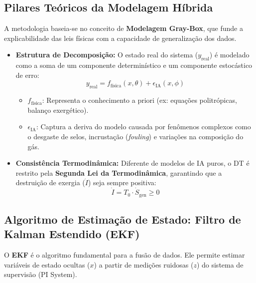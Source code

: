 \documentclass[12pt,a4paper]{article}
\numberwithin{equation}{section}
\numberwithin{table}{section}
\numberwithin{figure}{section}
\begin{document}
	\subsection{Pilares Teóricos da Modelagem Híbrida}
	
	A metodologia baseia-se no conceito de \textbf{Modelagem Gray-Box}, que funde a explicabilidade das leis físicas com a capacidade de generalização dos dados.
	
	\begin{itemize}
		\item \textbf{Estrutura de Decomposição:}
		O estado real do sistema ($y_{\text{real}}$) é modelado como a soma de um componente determinístico e um componente estocástico de erro:
		\begin{equation}\label{eq:s20-1}
 y_{\text{real}} = f_{\text{física}}(x, \theta) + \epsilon_{\text{IA}}(x, \phi) 
\end{equation}
		\begin{itemize}
			\item $f_{\text{física}}$: Representa o conhecimento a priori (ex: equações politrópicas, balanço exergético).
			\item $\epsilon_{\text{IA}}$: Captura a deriva do modelo causada por fenômenos complexos como o desgaste de selos, incrustação (\textit{fouling}) e variações na composição do gás.
		\end{itemize}
		
		\item \textbf{Consistência Termodinâmica:}
		Diferente de modelos de IA puros, o DT é restrito pela \textbf{Segunda Lei da Termodinâmica}, garantindo que a destruição de exergia ($\dot{I}$) seja sempre positiva:
		\begin{equation}\label{eq:s20-2}
 \dot{I} = T_0 \cdotp \dot{S}_{\text{gen}} \ge 0 
\end{equation}
	\end{itemize}
	
	\subsection{Algoritmo de Estimação de Estado: Filtro de Kalman Estendido (EKF)}
	
	O \textbf{EKF} é o algoritmo fundamental para a fusão de dados. Ele permite estimar variáveis de estado ocultas ($x$) a partir de medições ruidosas ($z$) do sistema de supervisão (PI System).
	
\end{document}
